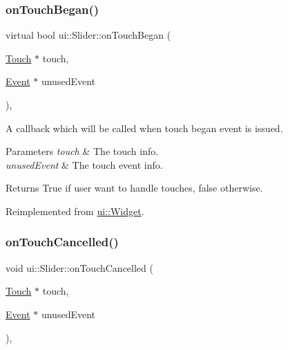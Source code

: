 \mbox{\label{classui_1_1Slider_a87345df854374dff2d59a401349e8de8}} 
\subsubsection{\texorpdfstring{on\+Touch\+Began()}{onTouchBegan()}\hspace{0.1cm}{\footnotesize\ttfamily [2/2]}}
{\footnotesize\ttfamily virtual bool ui\+::\+Slider\+::on\+Touch\+Began (\begin{DoxyParamCaption}\item[{\hyperlink{classTouch}{Touch} $\ast$}]{touch,  }\item[{\hyperlink{classEvent}{Event} $\ast$}]{unused\+Event }\end{DoxyParamCaption})\hspace{0.3cm}{\ttfamily [override]}, {\ttfamily [virtual]}}

A callback which will be called when touch began event is issued. 
\begin{DoxyParams}{Parameters}
{\em touch} & The touch info. \\
\hline
{\em unused\+Event} & The touch event info. \\
\hline
\end{DoxyParams}
\begin{DoxyReturn}{Returns}
True if user want to handle touches, false otherwise. 
\end{DoxyReturn}


Reimplemented from \hyperlink{classui_1_1Widget_a7885c770dde6daef771515c9857674a8}{ui\+::\+Widget}.

\mbox{\label{classui_1_1Slider_aefedbd6e07e51892ed7d82489d600658}} 
\subsubsection{\texorpdfstring{on\+Touch\+Cancelled()}{onTouchCancelled()}\hspace{0.1cm}{\footnotesize\ttfamily [1/2]}}
{\footnotesize\ttfamily void ui\+::\+Slider\+::on\+Touch\+Cancelled (\begin{DoxyParamCaption}\item[{\hyperlink{classTouch}{Touch} $\ast$}]{touch,  }\item[{\hyperlink{classEvent}{Event} $\ast$}]{unused\+Event }\end{DoxyParamCaption})\hspace{0.3cm}{\ttfamily [override]}, {\ttfamily [virtual]}}

